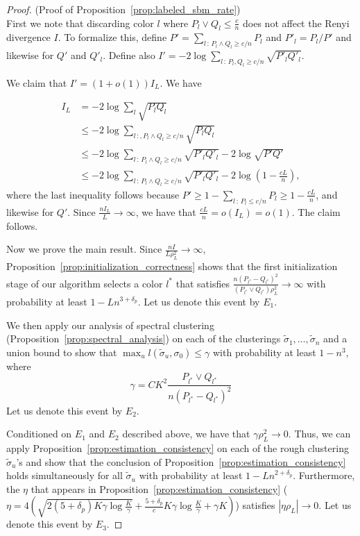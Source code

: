 \begin{proof} (Proof of Proposition~\ref{prop:labeled_sbm_rate})\\

First we note that discarding color $l$ where $P_l \vee  Q_l \leq \frac{c}{n}$ does not affect the Renyi divergence $I$. To formalize this, define
$P' = \sum_{l \,:\, P_l \wedge Q_l \geq c/n} P_l$ and $P'_l = P_l/P'$ and likewise for $Q'$ and $Q'_l$. Define also $I' = - 2 \log \sum_{l \,:\, P_l, Q_l \geq c/n} \sqrt{P'_l Q'_l}$.

We claim that $I' = (1 + o(1)) I_L$. We have

\begin{align*}
I_L &= -2 \log \sum_l \sqrt{P_l Q_l} \\
  &\leq -2 \log \sum_{l \,:, P_l \wedge Q_l \geq c/n} \sqrt{P_l Q_l} \\
  &\leq -2 \log \sum_{l \,:\, P_l \wedge Q_l \geq c/n} \sqrt{P'_l Q'_l} - 2 \log \sqrt{P' Q'} \\
  &\leq -2 \log \sum_{l \,:\, P_l \wedge Q_l \geq c/n} \sqrt{P'_l Q'_l} - 2\log\left(1 - \frac{cL}{n}\right),
\end{align*}
where the last inequality follows because $P' \geq 1 - \sum_{l \,:\, P_l \leq c/n} P_l \geq 1 - \frac{cL}{n}$, and likewise for $Q'$. Since $\frac{n I_L}{L} \rightarrow \infty$, we have that $\frac{cL}{n} = o(I_L) = o(1)$. The claim follows. 

Now we prove the main result. Since $\frac{ nI}{L \rho_L^2} \rightarrow \infty$, Proposition~\ref{prop:initialization_correctness} shows that the first initialization stage of our algorithm selects a color $l^*$ that satisfies $\frac{n (P_{l^*} - Q_{l^*})^2}{ (P_{l^*} \vee Q_{l^*}) \rho^2_L } \rightarrow \infty$ with probability at least $1 - Ln^{3 + \delta_p}$. Let us denote this event by $E_1$.

We then apply our analysis of spectral clustering (Proposition~\ref{prop:spectral_analysis}) on each of the clusterings $\tilde{\sigma}_1, \dots, \tilde{\sigma}_n$ and a union bound to show that $\max_u l( \tilde{\sigma}_u, \sigma_0) \leq \gamma$ with probability at least $1 - n^3$, where 
\[
\gamma = C K^2 \frac{ P_{l^*} \vee Q_{l^*}}{ n ( P_{l^*} - Q_{l^*} )^2} 
\]
Let us denote this event by $E_2$. 

Conditioned on $E_1$ and $E_2$ described above, we have that $\gamma \rho_L^2 \rightarrow 0$. Thus, we can apply Proposition~\ref{prop:estimation_consistency} on each of the rough clustering $\tilde{\sigma}_u$'s and show that the conclusion of Proposition~\ref{prop:estimation_consistency} holds simultaneously for all $\tilde{\sigma}_u$ with probability at least $1 - Ln^{2 + \delta_p}$. Furthermore, the $\eta$ that appears in Proposition~\ref{prop:estimation_consistency} ($\eta = 4 \left( \sqrt{2 (5 + \delta_p) K \gamma \log \frac{K}{\gamma} } + \frac{5 + \delta_p}{c} K \gamma \log \frac{K}{\gamma} + \gamma K \right)$) satisfies $|\eta \rho_L| \rightarrow 0$. Let us denote this event by $E_3$.


\end{proof}
